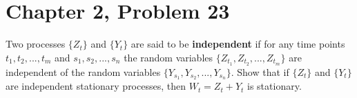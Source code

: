 \documentclass[11pt]{article}
\newif\ifclearpage
\newcommand{\problem}[1]{\section*{#1}}
\newcommand{\solution}{\hrulefill}
\newcommand{\maybeclearpage}{\ifclearpage\clearpage\fi}
\begin{document}
\solution


\maybeclearpage
\problem{Chapter 2, Problem 23}
Two processes $\{Z_t\}$ and $\{Y_t\}$ are said to be \textbf{independent} if for any time points $t_1,t_2,...,t_m$ and $s_1,s_2,...,s_n$ the random variables $\{Z_{t_1},Z_{t_2},...,Z_{t_m}\}$ are independent of the random variables $\{Y_{s_1},Y_{s_2},...,Y_{s_n}\}$. Show that if $\{Z_t\}$ and $\{Y_t\}$ are independent stationary processes, then $W_t=Z_t+Y_t$ is stationary.

\solution

\maybeclearpage
\end{document}
